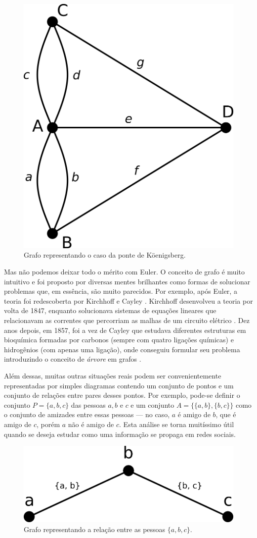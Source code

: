 \documentclass[a4paper,12pt]{article}
\begin{document}
\begin{figure}[H]
	\begin{center}
		\includegraphics[width=0.32\linewidth]{figures/koenigsbernGrafo.png}
	\end{center}
	\caption{Grafo representando o caso da ponte de Köenigsberg.}
	\label{fig:koniGrafo}
\end{figure}

Mas não podemos deixar todo o mérito com Euler. O conceito de grafo é muito intuitivo e foi proposto por diversas mentes brilhantes como formas de solucionar problemas que, em essência, são muito parecidos. Por exemplo, após Euler, a teoria foi redescoberta por Kirchhoff e Cayley \cite{graphTheoryFHarary}. Kirchhoff desenvolveu a teoria por volta de 1847, enquanto solucionava sistemas de equações lineares que relacionavam as correntes que percorriam as malhas de um circuito elétrico \cite{kirchhoff1847ueber}. Dez anos depois, em 1857, foi a vez de Cayley que estudava diferentes estruturas em bioquímica formadas por carbonos (sempre com quatro ligações químicas) e hidrogênios (com apenas uma ligação), onde conseguiu formular seu problema introduzindo o conceito de \textit{árvore} em grafos \cite{cayley1897theory}.  

Além dessas, muitas outras situações reais podem ser convenientemente representadas por simples diagramas contendo um conjunto de pontos e um conjunto de relações entre pares desses pontos. Por exemplo, pode-se definir o conjunto $P = \{a,b,c\}$ das pessoas $a, b$ e $c$ e um conjunto $A = \{\{a,b\}, \{b,c\}\}$ como o conjunto de amizades entre essas pessoas --- no caso, $a$ é amigo de $b$, que é amigo de $c$, porém $a$ não é amigo de $c$. 
Esta análise se torna muitíssimo útil quando se deseja estudar como uma informação se propaga em redes sociais.

\begin{figure}[H]
	\begin{center}
		\includegraphics[width=0.35\linewidth]{figures/socialGraph.png}
	\end{center}
	\caption{Grafo representando a relação entre as pessoas $\{a, b, c\}$.}
	\label{fig:socialGraph}
\end{figure}
\end{document}
